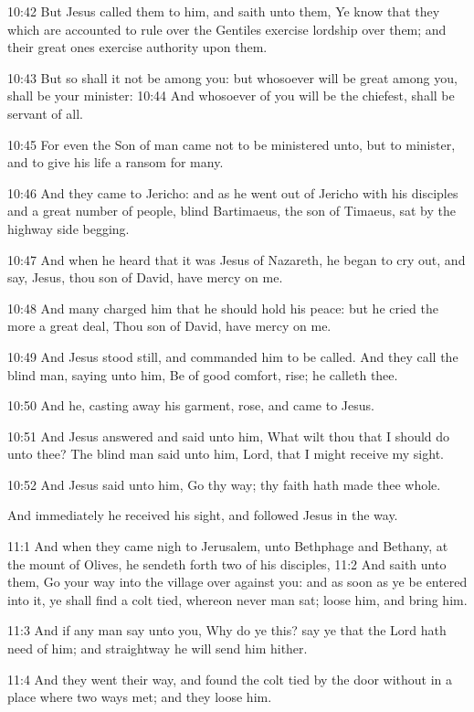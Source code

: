10:42 But Jesus called them to him, and saith unto them, Ye know that they which are accounted to rule over the Gentiles exercise lordship over them; and their great ones exercise authority upon them.

10:43 But so shall it not be among you: but whosoever will be great among you, shall be your minister: 10:44 And whosoever of you will be the chiefest, shall be servant of all.

10:45 For even the Son of man came not to be ministered unto, but to minister, and to give his life a ransom for many.

10:46 And they came to Jericho: and as he went out of Jericho with his disciples and a great number of people, blind Bartimaeus, the son of Timaeus, sat by the highway side begging.

10:47 And when he heard that it was Jesus of Nazareth, he began to cry out, and say, Jesus, thou son of David, have mercy on me.

10:48 And many charged him that he should hold his peace: but he cried the more a great deal, Thou son of David, have mercy on me.

10:49 And Jesus stood still, and commanded him to be called. And they call the blind man, saying unto him, Be of good comfort, rise; he calleth thee.

10:50 And he, casting away his garment, rose, and came to Jesus.

10:51 And Jesus answered and said unto him, What wilt thou that I should do unto thee? The blind man said unto him, Lord, that I might receive my sight.

10:52 And Jesus said unto him, Go thy way; thy faith hath made thee whole.

And immediately he received his sight, and followed Jesus in the way.

11:1 And when they came nigh to Jerusalem, unto Bethphage and Bethany, at the mount of Olives, he sendeth forth two of his disciples, 11:2 And saith unto them, Go your way into the village over against you: and as soon as ye be entered into it, ye shall find a colt tied, whereon never man sat; loose him, and bring him.

11:3 And if any man say unto you, Why do ye this? say ye that the Lord hath need of him; and straightway he will send him hither.

11:4 And they went their way, and found the colt tied by the door without in a place where two ways met; and they loose him.

